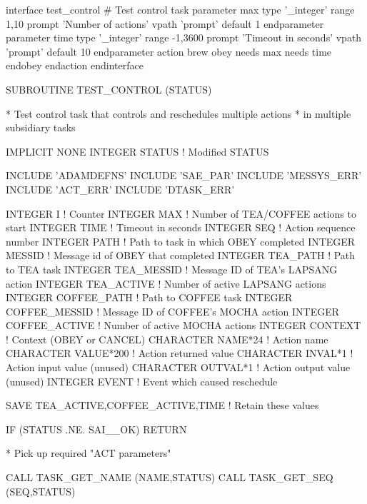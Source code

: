 \documentclass[twoside,11pt,nolof]{starlink}
\begin{document}
\begin{small}
\begin{terminalv}
interface test_control
#  Test control task
    parameter max
        type '_integer'
        range 1,10
        prompt 'Number of actions'
        vpath 'prompt'
        default 1
    endparameter
    parameter time
        type '_integer'
        range -1,3600
        prompt 'Timeout in seconds'
        vpath 'prompt'
        default 10
    endparameter
    action brew
        obey
            needs max
            needs time
        endobey
    endaction
endinterface

      SUBROUTINE TEST_CONTROL (STATUS)

*     Test control task that controls and reschedules multiple actions
*     in multiple subsidiary tasks

      IMPLICIT NONE
      INTEGER   STATUS          ! Modified STATUS

      INCLUDE   'ADAMDEFNS'
      INCLUDE   'SAE_PAR'
      INCLUDE   'MESSYS_ERR'
      INCLUDE   'ACT_ERR'
      INCLUDE   'DTASK_ERR'

      INTEGER   I               ! Counter
      INTEGER   MAX             ! Number of TEA/COFFEE actions to start
      INTEGER   TIME            ! Timeout in seconds
      INTEGER   SEQ             ! Action sequence number
      INTEGER   PATH            ! Path to task in which OBEY completed
      INTEGER   MESSID          ! Message id of OBEY that completed
      INTEGER   TEA_PATH        ! Path to TEA task
      INTEGER   TEA_MESSID      ! Message ID of TEA's LAPSANG action
      INTEGER   TEA_ACTIVE      ! Number of active LAPSANG actions
      INTEGER   COFFEE_PATH     ! Path to COFFEE task
      INTEGER   COFFEE_MESSID   ! Message ID of COFFEE's MOCHA action
      INTEGER   COFFEE_ACTIVE   ! Number of active MOCHA actions
      INTEGER   CONTEXT         ! Context (OBEY or CANCEL)
      CHARACTER NAME*24         ! Action name
      CHARACTER VALUE*200       ! Action returned value
      CHARACTER INVAL*1         ! Action input value (unused)
      CHARACTER OUTVAL*1        ! Action output value (unused)
      INTEGER EVENT             ! Event which caused reschedule

      SAVE TEA_ACTIVE,COFFEE_ACTIVE,TIME ! Retain these values

      IF (STATUS .NE. SAI__OK) RETURN

*  Pick up required "ACT parameters"

      CALL TASK_GET_NAME (NAME,STATUS)
      CALL TASK_GET_SEQ (SEQ,STATUS)


\end{terminalv}
\end{small}
\end{document}

